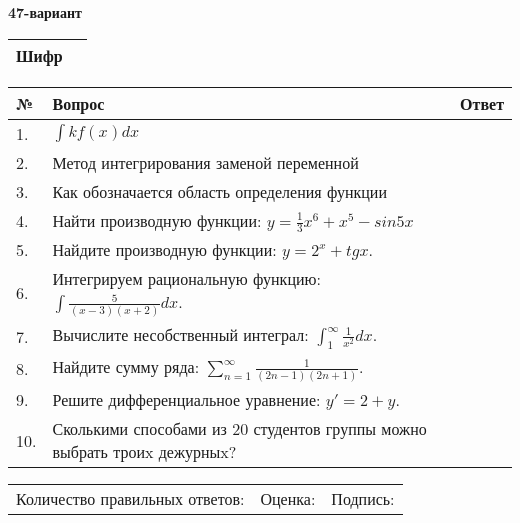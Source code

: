 \documentclass{article}
\begin{document}
  \egroup
  
  \newpage
  
  
  \textbf{47-вариант}\\
  
  \bgroup
  \def\arraystretch{1.6} %
  
  \begin{tabular}{|m{5.7cm}|m{9.5cm}|}
  \hline
  Шифр & \\
  \hline
  \end{tabular}
  
  \vspace{1cm}
  
  \begin{tabular}{|m{0.7cm}|m{10cm}|m{4cm}|}
  \hline
  № & Вопрос & Ответ \\
  \hline
  1. & \(\int{kf(x)}dx\) &  \\
  \hline
  2. & Метод интегрирования заменой переменной &  \\
  \hline
  3. & Как обозначается область определения функции &  \\
  \hline
  4. & Найти производную функции: \(y = \frac{1}{3}x^{6} + x^{5} - sin5x\) &  \\
  \hline
  5. & Найдите производную функции: \(y = 2^{x} + tgx\). &  \\
  \hline
  6. & Интегрируем рациональную функцию: \(\int{\frac{5}{(x - 3)(x + 2)}dx}\). &  \\
  \hline
  7. & Вычислите несобственный интеграл: \(\int_{1}^{\infty}{\frac{1}{x^{2}}dx}\). &  \\
  \hline
  8. & Найдите сумму ряда: \(\sum_{n = 1}^{\infty}\frac{1}{(2n - 1)(2n + 1)}\). &  \\
  \hline
  9. & Решите дифференциальное уравнение: \(y' = 2 + y\). &  \\
  \hline
  10. & Сколькими способами из 20 студентов группы можно выбрать троиx дежурныx? &  \\
  \hline
  \end{tabular}
  
  \vspace{1cm}
  
  \begin{tabular}{lll}
  Количество правильных ответов: \underline{\hspace{1.5cm}} & 
  Оценка: \underline{\hspace{1.5cm}} & 
  Подпись: \underline{\hspace{2cm}} \\
  \end{tabular}
  
\end{document}
